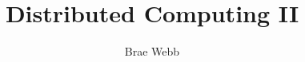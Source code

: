 \documentclass{csse4400}
\title{Distributed Computing II}
\author{Brae Webb}
\date{\week{6}}
\begin{document}
\makecover



% 
% 
\end{document}
